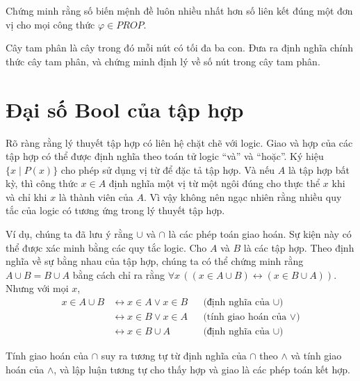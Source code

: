 \begin{exercise}
Chứng minh rằng số biến mệnh đề luôn nhiều nhất hơn số liên kết đúng một đơn vị cho mọi công thức $\varphi \in PROP$.
\end{exercise}

\begin{exercise}
Cây tam phân là cây trong đó mỗi nút có tối đa ba con. Đưa ra định nghĩa chính thức cây tam phân, và chứng minh định lý về số nút trong cây tam phân.
\end{exercise}


\section{Đại số Bool của tập hợp}

Rõ ràng rằng lý thuyết tập hợp có liên hệ chặt chẽ với logic. Giao và hợp của các tập hợp có thể được định nghĩa theo toán tử logic ``và'' và ``hoặc''. Ký hiệu $\{x \mid P(x)\}$ cho phép sử dụng vị từ để đặc tả tập hợp. Và nếu $A$ là tập hợp bất kỳ, thì công thức $x \in A$ định nghĩa một vị từ một ngôi đúng cho thực thể $x$ khi và chỉ khi $x$ là thành viên của $A$. Vì vậy không nên ngạc nhiên rằng nhiều quy tắc của logic có tương ứng trong lý thuyết tập hợp.

Ví dụ, chúng ta đã lưu ý rằng $\cup$ và $\cap$ là các phép toán giao hoán. Sự kiện này có thể được xác minh bằng các quy tắc logic. Cho $A$ và $B$ là các tập hợp. Theo định nghĩa về sự bằng nhau của tập hợp, chúng ta có thể chứng minh rằng $A \cup B = B \cup A$ bằng cách chỉ ra rằng $\forall x\,((x \in A \cup B) \leftrightarrow (x \in B \cup A))$. Nhưng với mọi $x$,
\begin{align*}
x \in A \cup B &\leftrightarrow x \in A \lor x \in B & &\text{(định nghĩa của } \cup\text{)} \\
&\leftrightarrow x \in B \lor x \in A & &\text{(tính giao hoán của } \lor\text{)} \\
&\leftrightarrow x \in B \cup A & &\text{(định nghĩa của } \cup\text{)}
\end{align*}

Tính giao hoán của $\cap$ suy ra tương tự từ định nghĩa của $\cap$ theo $\land$ và tính giao hoán của $\land$, và lập luận tương tự cho thấy hợp và giao là các phép toán kết hợp.

